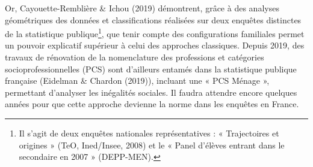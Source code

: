 \documentclass[12pt,a4paper]{reedthesis}
\begin{document}
Or, Cayouette-Remblière \& Ichou (2019) démontrent, grâce à des analyses géométriques des données et classifications réalisées sur deux enquêtes distinctes de la statistique publique\footnote{Il s'agit de deux enquêtes nationales représentatives : « Trajectoires et origines » (TeO, Ined/Insee, 2008) et le « Panel d'élèves entrant dans le secondaire en 2007 » (DEPP-MEN).}, que tenir compte des configurations familiales permet un pouvoir explicatif supérieur à celui des approches classiques. Depuis 2019, des travaux de rénovation de la nomenclature des professions et catégories socioprofessionnelles (PCS) sont d'ailleurs entamés dans la statistique publique française (Eidelman \& Chardon (2019)), incluant une « PCS Ménage », permettant d'analyser les inégalités sociales. Il faudra attendre encore quelques années pour que cette approche devienne la norme dans les enquêtes en France.
\end{document}
